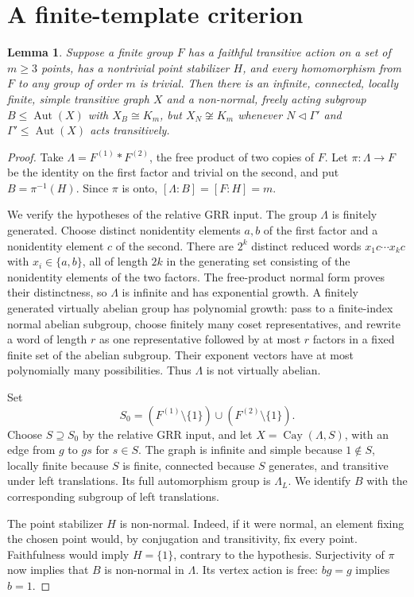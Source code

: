 \documentclass[11pt]{article}
\newtheorem{lemma}[theorem]{Lemma}
\DeclareMathOperator{\Aut}{Aut}
\DeclareMathOperator{\Cay}{Cay}
\begin{document}
\section{A finite-template criterion}
\begin{lemma}\label{lem:template}
Suppose a finite group $F$ has a faithful transitive action on a set of
$m\geq3$ points, has a nontrivial point stabilizer $H$, and every homomorphism
from $F$ to any group of order $m$ is trivial. Then there is an infinite,
connected, locally finite, simple transitive graph $X$ and a non-normal,
freely acting subgroup $B\leq\Aut(X)$ with $X_B\cong K_m$, but
$X_N\not\cong K_m$ whenever $N\lhd\Gamma'$ and
$\Gamma'\leq\Aut(X)$ acts transitively.
\end{lemma}
\begin{proof}
Take $\Lambda=F^{(1)}*F^{(2)}$, the free product of two copies of $F$.
Let $\pi:\Lambda\to F$ be the identity on the first factor and trivial on
the second, and put $B=\pi^{-1}(H)$. Since $\pi$ is onto,
$[\Lambda:B]=[F:H]=m$.

We verify the hypotheses of the relative GRR input. The group $\Lambda$ is
finitely generated. Choose distinct nonidentity elements $a,b$ of the first
factor and a nonidentity element $c$ of the second. There are $2^k$ distinct
reduced words $x_1c\cdots x_kc$ with $x_i\in\{a,b\}$, all of length $2k$
in the generating set consisting of the nonidentity elements of the two
factors. The free-product normal form proves their distinctness, so
$\Lambda$ is infinite and has exponential growth. A finitely generated
virtually abelian group has polynomial growth: pass to a finite-index
normal abelian subgroup, choose finitely many coset representatives, and
rewrite a word of length $r$ as one representative followed by at most $r$
factors in a fixed finite set of the abelian subgroup. Their exponent
vectors have at most polynomially many possibilities. Thus $\Lambda$ is
not virtually abelian.

Set
\[
 S_0=(F^{(1)}\setminus\{1\})\cup(F^{(2)}\setminus\{1\}).
\]
Choose $S\supseteq S_0$ by the relative GRR input, and let
$X=\Cay(\Lambda,S)$, with an edge from $g$ to $gs$ for $s\in S$.
The graph is infinite and simple because $1\notin S$, locally finite
because $S$ is finite, connected because $S$ generates, and transitive
under left translations. Its full automorphism group is $\Lambda_L$.
We identify $B$ with the corresponding subgroup of left translations.

The point stabilizer $H$ is non-normal. Indeed, if it were normal, an
element fixing the chosen point would, by conjugation and transitivity,
fix every point. Faithfulness would imply $H=\{1\}$, contrary to the
hypothesis. Surjectivity of $\pi$ now implies that $B$ is non-normal in
$\Lambda$. Its vertex action is free: $bg=g$ implies $b=1$.


\end{proof}
\end{document}
